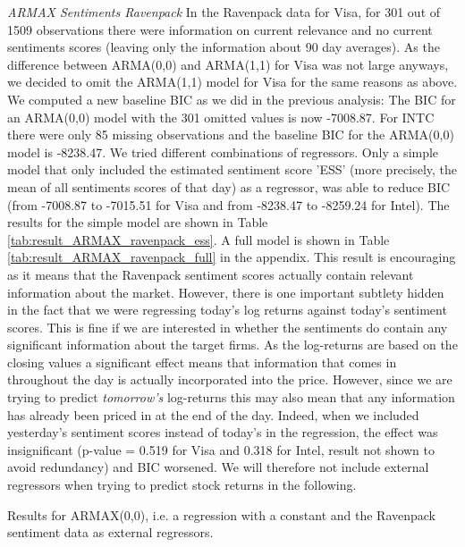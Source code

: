 \textit{ARMAX Sentiments Ravenpack}
In the Ravenpack data for Visa, for 301 out of 1509 observations there were information on current relevance and no current sentiments scores (leaving only the information about 90 day averages). As the difference between ARMA(0,0) and ARMA(1,1) for Visa was not large anyways, we decided to omit the ARMA(1,1) model for Visa for the same reasons as above. We computed a new baseline BIC as we did in the previous analysis: The BIC for an ARMA(0,0) model with the 301 omitted values is now -7008.87. For INTC there were only 85 missing observations and the baseline BIC for the ARMA(0,0) model is -8238.47. We tried different combinations of regressors. Only a simple model that only included the estimated sentiment score 'ESS' (more precisely, the mean of all sentiments scores of that day) as a regressor, was able to reduce BIC (from -7008.87 to -7015.51 for Visa and from -8238.47 to -8259.24 for Intel). The results for the simple model are shown in Table \ref{tab:result_ARMAX_ravenpack_ess}. A full model is shown in Table \ref{tab:result_ARMAX_ravenpack_full} in the appendix. This result is encouraging as it means that the Ravenpack sentiment scores actually contain relevant information about the market. However, there is one important subtlety hidden in the fact that we were regressing today's log returns against today's sentiment scores. This is fine if we are interested in whether the sentiments do contain any significant information about the target firms. As the log-returns are based on the closing values a significant effect means that information that comes in throughout the day is actually incorporated into the price. However, since we are trying to predict \textit{tomorrow's} log-returns this may also mean that any information has already been priced in at the end of the day. Indeed, when we included yesterday's sentiment scores instead of today's in the regression, the effect was insignificant (p-value = 0.519 for Visa and 0.318 for Intel, result not shown to avoid redundancy) and BIC worsened. We will therefore not include external regressors when trying to predict stock returns in the following. 

\begin{table}[h!]
    \centering
    \vspace{-2ex}
    \small
    
    \vspace{1ex}

    \vspace{-2ex}
    \small
    
    \caption{Results for ARMAX(0,0), i.e. a regression with a constant and the Ravenpack sentiment data as external regressors.}
    \label{tab:result_ARMAX_ravenpack_ess}
\end{table}

